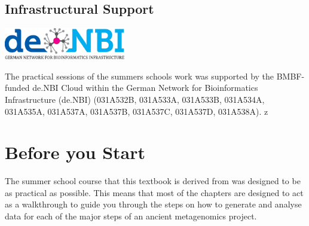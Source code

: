 \documentclass[
  letterpaper,
]{book}
\begin{document}
\begin{figure}
\begin{minipage}[t]{0.20\linewidth}
{\centering 


}

\end{minipage}%

\end{figure}

\hypertarget{infrastructural-support}{%
\section*{\texorpdfstring{\textbf{Infrastructural
Support}}{Infrastructural Support}}\label{infrastructural-support}}


\includegraphics[width=2.08333in,height=\textheight]{index_files/mediabag/assets/images/logos/denbi-logo-color.pdf}

The practical sessions of the summers schools work was supported by the
BMBF-funded de.NBI Cloud within the German Network for Bioinformatics
Infrastructure (de.NBI) (031A532B, 031A533A, 031A533B, 031A534A,
031A535A, 031A537A, 031A537B, 031A537C, 031A537D, 031A538A). z


\hypertarget{before-you-start}{%
\chapter*{Before you Start}\label{before-you-start}}


The summer school course that this textbook is derived from was designed
to be as practical as possible. This means that most of the chapters are
designed to act as a walkthrough to guide you through the steps on how
to generate and analyse data for each of the major steps of an ancient
metagenomics project.
\end{document}
